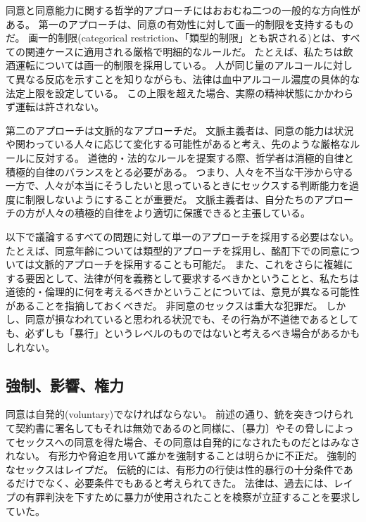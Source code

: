 \documentclass[paper=a4,book,openany]{jlreq}
\begin{document}
同意と同意能力に関する哲学的アプローチにはおおむね二つの一般的な方向性がある。
第一のアプローチは、同意の有効性に対して画一的制限を支持するものだ。
画一的制限(categorical restriction、「類型的制限」とも訳される)とは、すべての関連ケースに適用される厳格で明細的なルールだ。
たとえば、私たちは飲酒運転については画一的制限を採用している。
人が同じ量のアルコールに対して異なる反応を示すことを知りながらも、法律は血中アルコール濃度の具体的な法定上限を設定している。
この上限を超えた場合、実際の精神状態にかかわらず運転は許されない。

第二のアプローチは文脈的なアプローチだ。
文脈主義者は、同意の能力は状況や関わっている人々に応じて変化する可能性があると考え、先のような厳格なルールに反対する。
道徳的・法的なルールを提案する際、哲学者は消極的自律と積極的自律のバランスをとる必要がある。
つまり、人々を不当な干渉から守る一方で、人々が本当にそうしたいと思っているときにセックスする判断能力を過度に制限しないようにすることが重要だ。
文脈主義者は、自分たちのアプローチの方が人々の積極的自律をより適切に保護できると主張している。

以下で議論するすべての問題に対して単一のアプローチを採用する必要はない。
たとえば、同意年齢については類型的アプローチを採用し、酩酊下での同意については文脈的アプローチを採用することも可能だ。
また、これをさらに複雑にする要因として、法律が何を義務として要求するべきかということと、私たちは道徳的・倫理的に何を考えるべきかということについては、意見が異なる可能性があることを指摘しておくべきだ。
非同意のセックスは重大な犯罪だ。
しかし、同意が損なわれていると思われる状況でも、その行為が不道徳であるとしても、必ずしも「暴行」というレベルのものではないと考えるべき場合があるかもしれない。

\subsection{強制、影響、権力}

同意は自発的(voluntary)でなければならない。
前述の通り、銃を突きつけられて契約書に署名してもそれは無効であるのと同様に、〔暴力〕やその脅しによってセックスへの同意を得た場合、その同意は自発的になされたものだとはみなされない。
有形力や脅迫を用いて誰かを強制することは明らかに不正だ。
強制的なセックスはレイプだ。
伝統的には、有形力の行使は性的暴行の十分条件であるだけでなく、必要条件でもあると考えられてきた。
法律は、過去には、レイプの有罪判決を下すために暴力が使用されたことを検察が立証することを要求していた。
\end{document}
